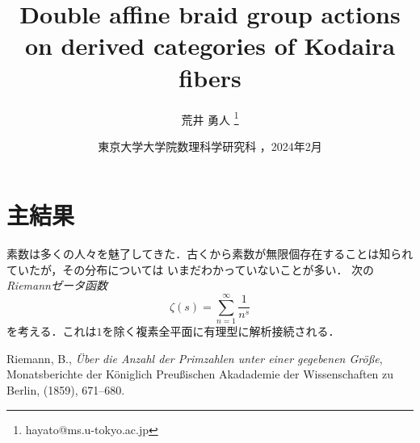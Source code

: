 \documentclass[a4j,uplatex,dvipdfmx]{jsarticle}
\title{%
Double affine braid group actions on derived categories of Kodaira fibers%
}
\author{%
荒井 勇人
\footnote{%
hayato@ms.u-tokyo.ac.jp%
}}
\date{%
東京大学大学院数理科学研究科%
，2024年2月%
}
\begin{document}
\pagestyle{empty}
\maketitle
\thispagestyle{empty}

\section{主結果}

素数は多くの人々を魅了してきた．古くから素数が無限個存在することは知られていたが，その分布については
いまだわかっていないことが多い．
次の\emph{Riemannゼータ函数}
\[
  \zeta(s)  =  \sum_{n = 1}^\infty \frac{1}{n^s}
\]
を考える\cite{R}．これは$1$を除く複素全平面に有理型に解析接続される．

\begin{thebibliography}{99}
  {Riemann, B.},
  {\em \"Uber die Anzahl der Primzahlen unter einer gegebenen Gr\"o\ss{}e},
  {Monatsberichte der K\"oniglich Preu\ss{}ischen Akadademie der Wissenschaften zu Berlin},
  (1859), 671--680.
\end{thebibliography}
\end{document}

